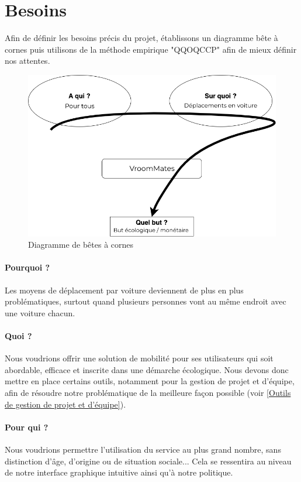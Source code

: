 \section{Besoins}

Afin de définir les besoins précis du projet, établissons un diagramme bête à cornes puis utilisons de la méthode empirique "QQOQCCP" afin de mieux définir nos attentes.

\begin{figure}[th]
\centering
\includegraphics[width=\linewidth]{medias/bete_a_cornes.png}
\decoRule
\caption{Diagramme de bêtes à cornes}
\end{figure}

\paragraph{Pourquoi ?}
Les moyens de déplacement par voiture deviennent de plus en plus problématiques, surtout quand plusieurs personnes vont au même endroit avec une voiture chacun.

\paragraph{Quoi ?}
Nous voudrions offrir une solution de mobilité pour ses utilisateurs qui soit abordable, efficace et inscrite dans une démarche écologique. Nous devons donc mettre en place certains outils, notamment pour la  gestion de projet et d'équipe, afin de résoudre notre problématique de la meilleure façon possible (voir \ref{Outils de gestion de projet et d’équipe}).

\paragraph{Pour qui ?}
Nous voudrions permettre l'utilisation du service au plus grand nombre, sans distinction d'âge, d'origine ou de situation sociale... Cela se ressentira au niveau de notre interface graphique intuitive ainsi qu'à notre politique.

